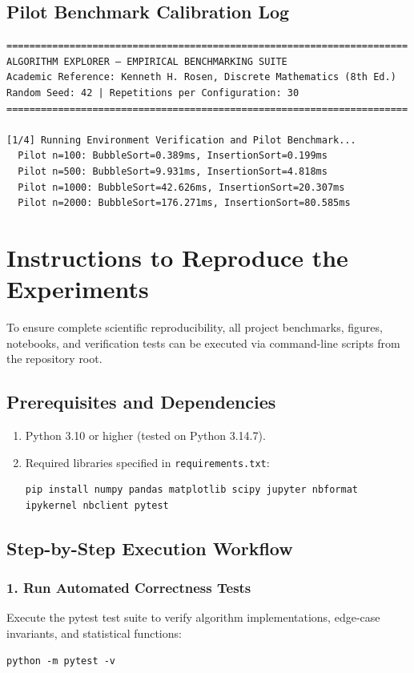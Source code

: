 \documentclass[11pt,a4paper,oneside]{report}
\theoremstyle{definition}
\begin{document}
\section{Pilot Benchmark Calibration Log}
\begin{verbatim}
======================================================================
ALGORITHM EXPLORER — EMPIRICAL BENCHMARKING SUITE
Academic Reference: Kenneth H. Rosen, Discrete Mathematics (8th Ed.)
Random Seed: 42 | Repetitions per Configuration: 30
======================================================================

[1/4] Running Environment Verification and Pilot Benchmark...
  Pilot n=100: BubbleSort=0.389ms, InsertionSort=0.199ms
  Pilot n=500: BubbleSort=9.931ms, InsertionSort=4.818ms
  Pilot n=1000: BubbleSort=42.626ms, InsertionSort=20.307ms
  Pilot n=2000: BubbleSort=176.271ms, InsertionSort=80.585ms
\end{verbatim}

\chapter{Instructions to Reproduce the Experiments}
\label{app:reproduction}

To ensure complete scientific reproducibility, all project benchmarks, figures, notebooks, and verification tests can be executed via command-line scripts from the repository root.

\section{Prerequisites and Dependencies}
\begin{enumerate}
    \item Python 3.10 or higher (tested on Python 3.14.7).
    \item Required libraries specified in \texttt{requirements.txt}:
\begin{verbatim}
pip install numpy pandas matplotlib scipy jupyter nbformat ipykernel nbclient pytest
\end{verbatim}
\end{enumerate}

\section{Step-by-Step Execution Workflow}

\subsection{1. Run Automated Correctness Tests}
Execute the pytest test suite to verify algorithm implementations, edge-case invariants, and statistical functions:
\begin{verbatim}
python -m pytest -v
\end{verbatim}
\end{document}
